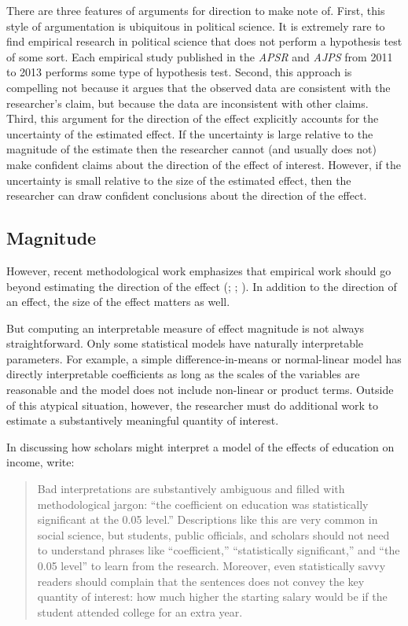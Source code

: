 \documentclass[12pt]{article}
\begin{document}
There are three features of arguments for direction to make note of. First, this style of argumentation is ubiquitous in political science. It is extremely rare to find empirical research in political science that does not perform a hypothesis test of some sort. Each empirical study published in the \textit{APSR} and \textit{AJPS} from 2011 to 2013 performs some type of hypothesis test. Second, this approach is compelling not because it argues that the observed data are consistent with the researcher's claim, but because the data are inconsistent with other claims. Third, this argument for the direction of the effect explicitly accounts for the uncertainty of the estimated effect. If the uncertainty is large relative to the magnitude of the estimate then the researcher cannot (and usually does not) make confident claims about the direction of the effect of interest. However, if the uncertainty is small relative to the size of the estimated effect, then the researcher can draw confident conclusions about the direction of the effect. 

\subsection*{Magnitude}

However, recent methodological work emphasizes that empirical work should go beyond estimating the direction of the effect (\citealt{KingTomzWittenberg2000}; \citealt{HanmerKalkan2013}; \citealt{Gross2014}). In addition to the direction of an effect, the size of the effect matters as well. 

But computing an interpretable measure of effect magnitude is not always straightforward. Only some statistical models have naturally interpretable parameters. For example, a simple difference-in-means or normal-linear model has directly interpretable coefficients as long as the scales of the variables are reasonable and the model does not include non-linear or product terms. Outside of this atypical situation, however, the researcher must do additional work to estimate a substantively meaningful quantity of interest.

In discussing how scholars might interpret a model of the effects of education on income, \citet[p. 348]{KingTomzWittenberg2000} write:

\begin{quote}
Bad interpretations are substantively ambiguous and filled with methodological jargon: ``the coefficient on education was statistically significant at the 0.05 level.'' Descriptions like this are very common in social science, but students, public officials, and scholars should not need to understand phrases like ``coefficient,'' ``statistically significant,'' and ``the 0.05 level'' to learn from the research. Moreover, even statistically savvy readers should complain that the sentences does not convey the key quantity of interest: how much higher the starting salary would be if the student attended college for an extra year.
\end{quote}
\end{document}
